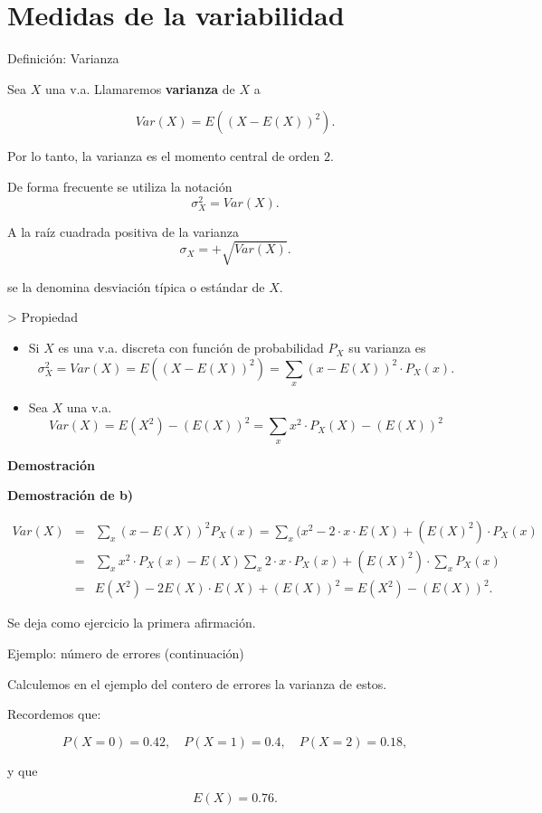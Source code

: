 \documentclass[
  letterpaper,
  DIV=11,
  numbers=noendperiod]{scrreprt}
\providecommand{\tightlist}{%
  \setlength{\itemsep}{0pt}\setlength{\parskip}{0pt}}\usepackage{longtable,booktabs,array}
\begin{document}
\section{Medidas de la variabilidad}\label{medidas-de-la-variabilidad}

Definición: Varianza

Sea \(X\) una v.a. Llamaremos \textbf{varianza} de \(X\) a

\[Var(X)=E((X-E(X))^2).\]

Por lo tanto, la varianza es el momento central de orden \(2\).

De forma frecuente se utiliza la notación \[\sigma_{X}^2=Var(X).\]

A la raíz cuadrada positiva de la varianza
\[\sigma_{X}=+\sqrt{Var(X)}.\]

se la denomina desviación típica o estándar de \(X\).

\textgreater{} Propiedad

\begin{itemize}
\tightlist
\item
  Si \(X\) es una v.a. discreta con función de probabilidad \(P_X\) su
  varianza es
  \[\sigma_{X}^2=Var(X)=E((X-E(X))^2)=\sum_{x}(x-E(X))^2\cdot  P_{X}(x).\]
\item
  Sea \(X\) una v.a.
  \[Var(X)=E(X^2)-(E(X))^2=\sum_{x} x^2\cdot  P_{X}(X)-(E(X))^2\]
\end{itemize}

\textbf{Demostración}

\textbf{Demostración de b)}

\begin{eqnarray*}
Var(X)&= & \sum_{x}(x-E(X))^2 P_{X}(x) = \sum_{x}(x^2 -2\cdot x\cdot E(X)+(E(X)^2)\cdot P_{X}(x)\\
&=& \sum_{x}x^2\cdot P_{X}(x) -  E(X)\sum_{x}2\cdot x \cdot P_{X}(x) + (E(X)^2)\cdot\sum_{x} P_{X}(x)\\
&=& E(X^2)- 2 E(X)\cdot E(X) + (E(X))^2=E(X^2)-(E(X))^2.
\end{eqnarray*}

Se deja como ejercicio la primera afirmación.

Ejemplo: número de errores (continuación)

Calculemos en el ejemplo del contero de errores la varianza de estos.

Recordemos que:

\[
P(X=0)=0.42,\quad P(X=1)=0.4, \quad P(X=2)=0.18,
\]

y que

\[
E(X)=0.76.
\]
\end{document}
